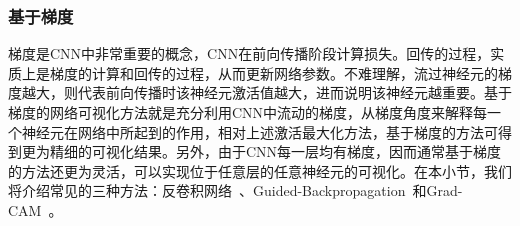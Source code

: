 
\subsubsection{基于梯度}\label{subsec:gradient_based_methods}
梯度是CNN中非常重要的概念，CNN在前向传播阶段计算损失。回传的过程，实质上是梯度的计算和回传的过程，从而更新网络参数。不难理解，流过神经元的梯度越大，则代表前向传播时该神经元激活值越大，进而说明该神经元越重要。基于梯度的网络可视化方法就是充分利用CNN中流动的梯度，从梯度角度来解释每一个神经元在网络中所起到的作用，相对上述激活最大化方法，基于梯度的方法可得到更为精细的可视化结果。另外，由于CNN每一层均有梯度，因而通常基于梯度的方法还更为灵活，可以实现位于任意层的任意神经元的可视化。在本小节，我们将介绍常见的三种方法：反卷积网络~\cite{zeiler2010deconvolutional}、Guided-Backpropagation~\cite{springenberg2014striving}和Grad-CAM~\cite{selvaraju2017grad}。

